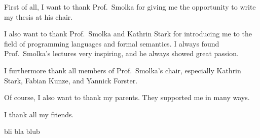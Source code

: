 First of all, I want to thank Prof.~Smolka for giving me the opportunity to write my thesis at his chair.

I also want to thank Prof.~Smolka and Kathrin Stark for introducing me to the field of programming languages and formal semantics.
I always found Prof.~Smolka's lectures very inspiring, and he always showed great passion.

I furthermore thank all members of Prof.~Smolka's chair, especially Kathrin Stark, Fabian Kunze, and Yannick Forster.

Of course, I also want to thank my parents.
They supported me in many ways.

I thank all my friends. 

bli bla blub



